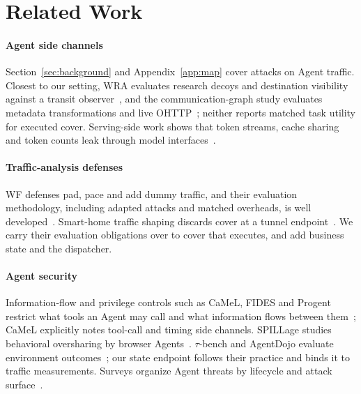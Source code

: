\section{Related Work}\label{sec:related}
\paragraph{Agent side channels}
Section~\ref{sec:background} and Appendix~\ref{app:map} cover attacks on Agent traffic. Closest to our setting, WRA evaluates research decoys and destination visibility against a transit observer~\cite{jeong2026wra}, and the communication-graph study evaluates metadata transformations and live OHTTP~\cite{dangol2026workflow}; neither reports matched task utility for executed cover. Serving-side work shows that token streams, cache sharing and token counts leak through model interfaces~\cite{weiss2024prompt,whisperleak2025,earlybird2025,timewilltell2024,carlini2024timing,wu2026cacheprune}.

\paragraph{Traffic-analysis defenses}
WF defenses pad, pace and add dummy traffic, and their evaluation methodology, including adapted attacks and matched overheads, is well developed~\cite{juarez2014critical,mathews2023critical,dyer2012peekaboo,wang2017walkietalkie,gong2020front,juarez2016wtfpad,shmatikov2006adaptive,cai2014tamaraw}. Smart-home traffic shaping discards cover at a tunnel endpoint~\cite{apthorpe2019stp}. We carry their evaluation obligations over to cover that executes, and add business state and the dispatcher.

\paragraph{Agent security}
Information-flow and privilege controls such as CaMeL, FIDES and Progent restrict what tools an Agent may call and what information flows between them~\cite{debenedetti2025camel,costa2025fides,shi2025progent}; CaMeL explicitly notes tool-call and timing side channels. SPILLage studies behavioral oversharing by browser Agents~\cite{roh2026spillage}. $\tau$-bench and AgentDojo evaluate environment outcomes~\cite{yao2024taubench,debenedetti2024agentdojo}; our state endpoint follows their practice and binds it to traffic measurements. Surveys organize Agent threats by lifecycle and attack surface~\cite{yao2024survey,shahriar2025survey,ferrag2025survey}.
